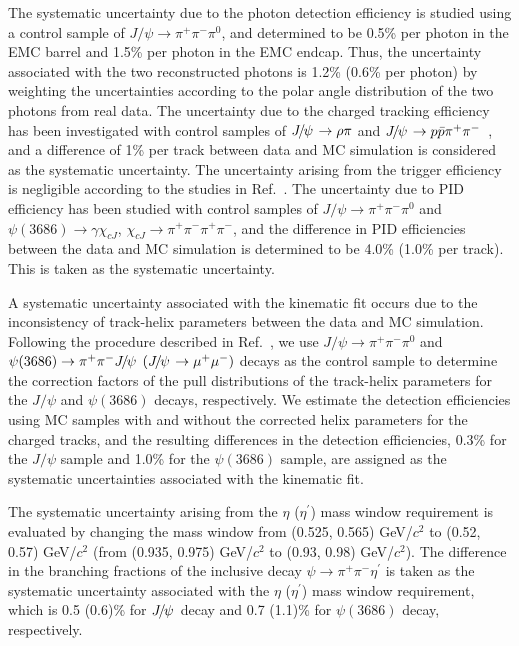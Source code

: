 \documentclass[twocolumn,showpacs,aps,prd]{revtex4-1}
\newcommand{\etap}{\eta^{\prime}}
\newcommand{\psip}{\psi(3686)}
\begin{document}
The systematic uncertainty due to the photon detection efficiency is studied using a control sample of $J/\psi \to \pi^+\pi^-\pi^0$,
and determined to be 0.5\% per photon in the EMC barrel and 1.5\% per photon in the EMC endcap. Thus, the uncertainty associated with the two  reconstructed photons is 1.2\% (0.6\% per photon) by weighting the uncertainties according to the polar angle distribution of the two photons from real data. The uncertainty due to
the charged tracking efficiency has been investigated with control samples of ${J\mskip -3mu/\mskip -2mu\psi\mskip 2mu} \rightarrow \rho \pi$ and ${J\mskip -3mu/\mskip -2mu\psi\mskip 2mu} \rightarrow p \bar{p} \pi^{+} \pi^{-}$~\cite{psiptrack}, and a difference of 1\% per
track between data and MC simulation is considered as the systematic uncertainty. The uncertainty arising from the trigger efficiency is negligible
according to the studies in Ref.~\cite{triggereff}. The uncertainty due to PID efficiency has been studied with control samples
of $J/\psi\to \pi^+\pi^-\pi^0$ and $\psip\to \gamma\chi_{cJ}$, $\chi_{cJ}\to \pi^+\pi^-\pi^+\pi^-$, and the difference in PID efficiencies between the data and MC simulation is determined to be 4.0\% (1.0\% per track).  This is taken as the systematic uncertainty.

A systematic uncertainty associated with the kinematic fit occurs due to the inconsistency of track-helix parameters between the data and MC simulation. Following the procedure described in Ref.~\cite{4cfit}, we use $J/\psi\to \pi^+\pi^-\pi^0$ and $\psip \to \pi^{+} \pi^{-} \jpsi~(\jpsi \to \mu^{+} \mu^{-})$ decays as the control
sample to determine the correction factors of the pull distributions of the track-helix parameters for the $J/\psi$ and $\psip$ decays, respectively. We estimate the detection efficiencies using MC samples with and without the corrected helix parameters for the charged tracks, and the resulting differences in the detection efficiencies, 0.3\% for the $J/\psi$ sample and 1.0\% for the $\psip$ sample, are assigned as the systematic
uncertainties associated with the kinematic fit.

The systematic uncertainty arising from the $\eta$ ($\etap$) mass window requirement is evaluated by changing the mass window from (0.525, 0.565) GeV/$c^{2}$ to (0.52, 0.57) GeV/$c^{2}$ (from (0.935, 0.975) GeV/$c^{2}$ to (0.93, 0.98) GeV/$c^{2}$). The difference in the branching fractions of the inclusive decay $\psi \to \pi^{+} \pi^{-} \etap$ is taken as the systematic uncertainty associated with the $\eta$ ($\etap$) mass window requirement, which is 0.5 (0.6)\% for ${J\mskip -3mu/\mskip -2mu\psi\mskip 2mu}$ decay and 0.7 (1.1)\% for $\psip$ decay, respectively.
\end{document}
